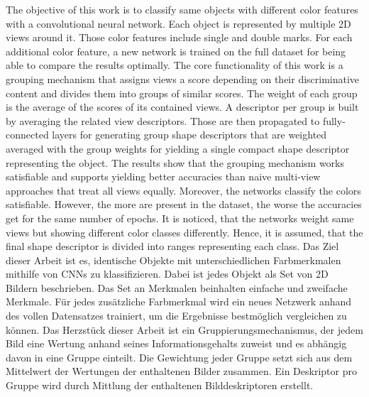 \documentclass[a4paper,            	%
               12pt,               	%
               chapterprefix,      	%
               appendixprefix,		%
               headsepline,        	%
               twoside,				%
               draft=false]         %
               {scrbook}			%
\theoremstyle{defstyle}
\theoremstyle{bspstyle}
\begin{document}
\frontmatter			%
\maketitle				%
\begin{BaMaAbstract}{	%
	The objective of this work is to classify same objects with different color features with a convolutional neural network.
	Each object is represented by multiple 2D views around it.
	Those color features include single and double marks.
	For each additional color feature, a new network is trained on the full dataset for being able to compare the results optimally.
	The core functionality of this work is a grouping mechanism that assigns views a score depending on their discriminative content and divides them into groups of similar scores.
	The weight of each group is the average of the scores of its contained views.
	A descriptor per group is built by averaging the related view descriptors.
	Those are then propagated to fully-connected layers for generating group shape descriptors that are weighted averaged with the group weights for yielding a single compact shape descriptor representing the object.
	The results show that the grouping mechanism works satisfiable and supports yielding better accuracies than naive multi-view approaches that treat all views equally.
	Moreover, the networks classify the colors satisfiable.
	However, the more are present in the dataset, the worse the accuracies get for the same number of epochs.
	It is noticed, that the networks weight same views but showing different color classes differently.
	Hence, it is assumed, that the final shape descriptor is divided into ranges representing each class.
}{
	Das Ziel dieser Arbeit ist es, identische Objekte mit unterschiedlichen Farbmerkmalen mithilfe von CNNs zu klassifizieren.
	Dabei ist jedes Objekt als Set von 2D Bildern beschrieben.
	Das Set an Merkmalen beinhalten einfache und zweifache Merkmale.
	Für jedes zusätzliche Farbmerkmal wird ein neues Netzwerk anhand des vollen Datensatzes trainiert, um die Ergebnisse bestmöglich vergleichen zu können.
	Das Herzstück dieser Arbeit ist ein Gruppierungsmechanismus, der jedem Bild eine Wertung anhand seines Informationsgehalts zuweist und es abhängig davon in eine Gruppe einteilt.
	Die Gewichtung jeder Gruppe setzt sich aus dem Mittelwert der Wertungen der enthaltenen Bilder zusammen.
	Ein Deskriptor pro Gruppe wird durch Mittlung der enthaltenen Bilddeskriptoren erstellt.
}
\end{BaMaAbstract}
\end{document}
